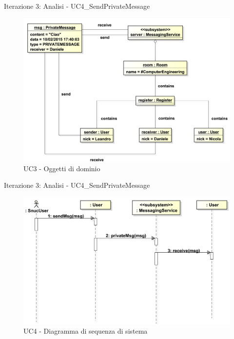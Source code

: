 \documentclass[t]{beamer} %
\begin{document}
\begin{frame} {Iterazione 3: Analisi - UC4\_SendPrivateMessage}
   \begin{figure}
     \includegraphics[scale=0.435]{image_astah/Iteration_3_DomainModel/UC4_SendPrivateMessage_OM.png}{\centering}
     \caption{UC3 - Oggetti di dominio}
     \label{fig_UC4_SPM_OM} 
   \end{figure}
\end{frame}

\begin{frame} {Iterazione 3: Analisi - UC4\_SendPrivateMessage}
   \begin{figure}
     \includegraphics[scale=0.33]{image_astah/Iteration_3_DomainModel/UC4_SendPrivateMessage_SSD.png}{\centering}
     \caption{UC4 - Diagramma di sequenza di sistema}
     \label{fig_UC4_SPM_SSD} 
   \end{figure}
\end{frame}
\end{document}

